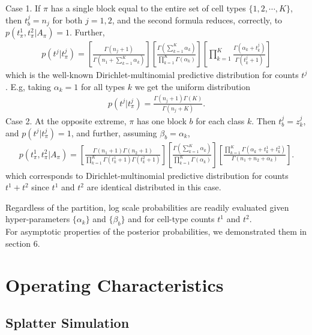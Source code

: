 \documentclass[11pt]{amsart}
\begin{document}
Case 1. If $\pi$ has a single block equal to the entire
 set of cell types $\{1,2, \cdots, K\}$,  then $t^j_b=n_j$ for both $j=1,2$,
and the second formula reduces, correctly, to 
$p(t^1_{\pi},t^2_{\pi}| A_{\pi}) = 1$.  Further,
\begin{eqnarray*}
p(t^j | t^j_{\pi}) = 
\left[ \frac{ \Gamma(n_j +1 ) }{ \Gamma( n_1 + \sum_{k=1}^K \alpha_k ) }
\right]
\left[ \frac{\Gamma( \sum_{k =1}^K \alpha_k )}{
                \prod_{k=1}^K \Gamma( \alpha_k ) } \right]
       \left[    \prod_{k=1}^K    \frac{  \Gamma(\alpha_k + t^j_k)}{
                \Gamma(t^j_k + 1 )}\right]
\end{eqnarray*}
which is the well-known Dirichlet-multinomial predictive distribution
for counts $t^j$ \cite{Wag}.  E.g, taking $\alpha_k=1$ for all types $k$ 
we get the uniform distribution
\begin{eqnarray*}
p(t^j | t^j_{\pi}) = 
 \frac{ \Gamma(n_j +1 ) \Gamma(K) }{ \Gamma( n_j + K ) }.
\end{eqnarray*}
Case 2. At the opposite extreme, $\pi$  has one block $b$ for each
 class $k$. Then $t^j_b = z^j_k$, and $p(t^j | t^j_{\pi}) = 1$, and 
further, assuming $\beta_b = \alpha_k$,
\begin{eqnarray*}
p(t^1_{\pi},t^2_{\pi}| A_{\pi}) =
 \left[ \frac{ \Gamma(n_1+1) \Gamma(n_2+1) }{ \prod_{k=1}^K 
   \Gamma(t^1_k+1) 
   \Gamma( t^2_k + 1 )} \right] 
\left[ \frac{\Gamma( \sum_{k=1}^K \alpha_k  )}{
   \prod_{k=1}^K \Gamma(\alpha_k )} \right] 
 \left[ \frac{ \prod_{k=1}^K \Gamma( \alpha_k + t^1_k + t^2_k )}{
	\Gamma( n_1 + n_2 + \alpha_k  )} \right].
\end{eqnarray*}
which corresponds to Dirichlet-multinomial predictive distribution for counts $t^1 + t^2$ 
since $t^1$ and $t^2$ are identical distributed in this case.

Regardless of the partition,
log scale probabilities are readily evaluated 
given hyper-parameters $\{ \alpha_k \}$ and $\{ \beta_b \}$ and for
cell-type counts $t^1$ and $t^2$. \\
For asymptotic properties of the posterior probabilities, we demonstrated them in section 6. 
 
\section{Operating Characteristics}

\subsection{Splatter Simulation} 
\end{document}
